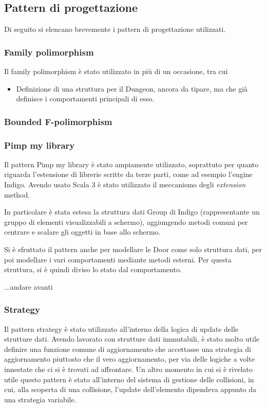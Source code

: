 \subsection{Pattern di progettazione}
Di seguito si elencano brevemente i pattern di progettazione utilizzati. 
\subsubsection{Family polimorphism}
Il family polimorphism è stato utilizzato in più di un occasione, tra cui
\begin{itemize}
    \item Definizione di una struttura per il Dungeon, ancora da tipare, ma che già definisce i comportamenti principali di esso.
\end{itemize}
\subsubsection{Bounded F-polimorphism}
\subsubsection{Pimp my library}
Il pattern Pimp my library è stato ampiamente utilizzato, soprattuto per quanto riguarda l'estensione di librerie scritte da terze parti, come ad esempio l'engine Indigo. 
Avendo usato Scala 3 è stato utilizzato il meccanismo degli \textit{extension} method.

In particolare è stata estesa la struttura dati Group di Indigo (rappresentante un gruppo di elementi visualizzabili a schermo), aggiungendo metodi comuni per centrare e scalare gli oggetti in base allo schermo.

Si è sfruttato il pattern anche per modellare le Door come solo struttura dati, per poi modellare i vari comportamenti mediante metodi esterni. Per questa struttura, si è quindi diviso lo stato dal comportamento. 

...andare avanti

\subsubsection{Strategy}
Il pattern strategy è stato utilizzato all'interno della logica di update delle strutture dati. Avendo lavorato con strutture dati immutabili, è stato molto utile definire una funzione comune di aggiornamento che accettasse una strategia di aggiornamento piuttosto che il vero aggiornamento, per via delle logiche a volte innestate che ci si è trovati ad affrontare. 
Un altro momento in cui si è rivelato utile questo pattern è stato all'interno del sistema di gestione delle collisioni, in cui, alla scoperta di una collisione, l'update dell'elemento dipendeva appunto da una strategia variabile. 
